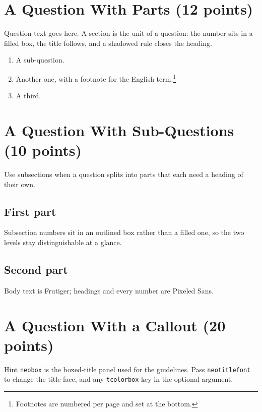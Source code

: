 \section{A Question With Parts (12 points)}

Question text goes here. A section is the unit of a question: the number sits
in a filled box, the title follows, and a shadowed rule closes the heading.

\begin{enumerate}
    \item A sub-question.
    \item Another one, with a footnote for the English term.\footnote{Footnotes
          are numbered per page and set at the bottom.}
    \item A third.
\end{enumerate}

\section{A Question With Sub-Questions (10 points)}

Use subsections when a question splits into parts that each need a heading of
their own.

\subsection{First part}

Subsection numbers sit in an outlined box rather than a filled one, so the two
levels stay distinguishable at a glance.

\subsection{Second part}

Body text is Frutiger; headings and every number are Pixeled Sans.

\section{A Question With a Callout (20 points)}

\begin{neobox}[neotitlefont=\pixelfont]{Hint}
    \texttt{neobox} is the boxed-title panel used for the guidelines. Pass
    \texttt{neotitlefont} to change the title face, and any \texttt{tcolorbox}
    key in the optional argument.
\end{neobox}
